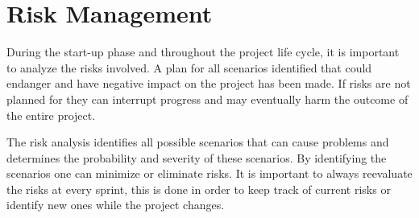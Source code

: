 \clearpage

\chapter{Risk Management}
During the start-up phase and throughout the project life cycle, it is important to analyze the risks involved. A plan for all scenarios identified that could endanger and have negative impact on the project has been made. If risks are not planned for they can interrupt progress and may eventually harm the outcome of the entire project. \bigskip

The risk analysis identifies all possible scenarios that can cause problems and determines the probability and severity of these scenarios. By identifying the scenarios one can minimize or eliminate risks. It is important to always reevaluate the risks at every sprint, this is done in order to keep track of current risks or identify new ones while the project changes. \bigskip

